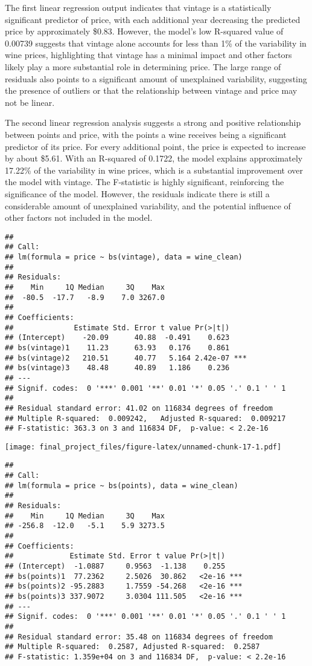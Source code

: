 \documentclass[
]{article}
\begin{document}
The first linear regression output indicates that vintage is a
statistically significant predictor of price, with each additional year
decreasing the predicted price by approximately \$0.83. However, the
model's low R-squared value of 0.00739 suggests that vintage alone
accounts for less than 1\% of the variability in wine prices,
highlighting that vintage has a minimal impact and other factors likely
play a more substantial role in determining price. The large range of
residuals also points to a significant amount of unexplained
variability, suggesting the presence of outliers or that the
relationship between vintage and price may not be linear.

The second linear regression analysis suggests a strong and positive
relationship between points and price, with the points a wine receives
being a significant predictor of its price. For every additional point,
the price is expected to increase by about \$5.61. With an R-squared of
0.1722, the model explains approximately 17.22\% of the variability in
wine prices, which is a substantial improvement over the model with
vintage. The F-statistic is highly significant, reinforcing the
significance of the model. However, the residuals indicate there is
still a considerable amount of unexplained variability, and the
potential influence of other factors not included in the model.

\begin{verbatim}
## 
## Call:
## lm(formula = price ~ bs(vintage), data = wine_clean)
## 
## Residuals:
##    Min     1Q Median     3Q    Max 
##  -80.5  -17.7   -8.9    7.0 3267.0 
## 
## Coefficients:
##              Estimate Std. Error t value Pr(>|t|)    
## (Intercept)    -20.09      40.88  -0.491    0.623    
## bs(vintage)1    11.23      63.93   0.176    0.861    
## bs(vintage)2   210.51      40.77   5.164 2.42e-07 ***
## bs(vintage)3    48.48      40.89   1.186    0.236    
## ---
## Signif. codes:  0 '***' 0.001 '**' 0.01 '*' 0.05 '.' 0.1 ' ' 1
## 
## Residual standard error: 41.02 on 116834 degrees of freedom
## Multiple R-squared:  0.009242,   Adjusted R-squared:  0.009217 
## F-statistic: 363.3 on 3 and 116834 DF,  p-value: < 2.2e-16
\end{verbatim}

\texttt{[image: final\_project\_files/figure-latex/unnamed-chunk-17-1.pdf]}

\begin{verbatim}
## 
## Call:
## lm(formula = price ~ bs(points), data = wine_clean)
## 
## Residuals:
##    Min     1Q Median     3Q    Max 
## -256.8  -12.0   -5.1    5.9 3273.5 
## 
## Coefficients:
##             Estimate Std. Error t value Pr(>|t|)    
## (Intercept)  -1.0887     0.9563  -1.138    0.255    
## bs(points)1  77.2362     2.5026  30.862   <2e-16 ***
## bs(points)2 -95.2883     1.7559 -54.268   <2e-16 ***
## bs(points)3 337.9072     3.0304 111.505   <2e-16 ***
## ---
## Signif. codes:  0 '***' 0.001 '**' 0.01 '*' 0.05 '.' 0.1 ' ' 1
## 
## Residual standard error: 35.48 on 116834 degrees of freedom
## Multiple R-squared:  0.2587, Adjusted R-squared:  0.2587 
## F-statistic: 1.359e+04 on 3 and 116834 DF,  p-value: < 2.2e-16
\end{verbatim}
\end{document}

